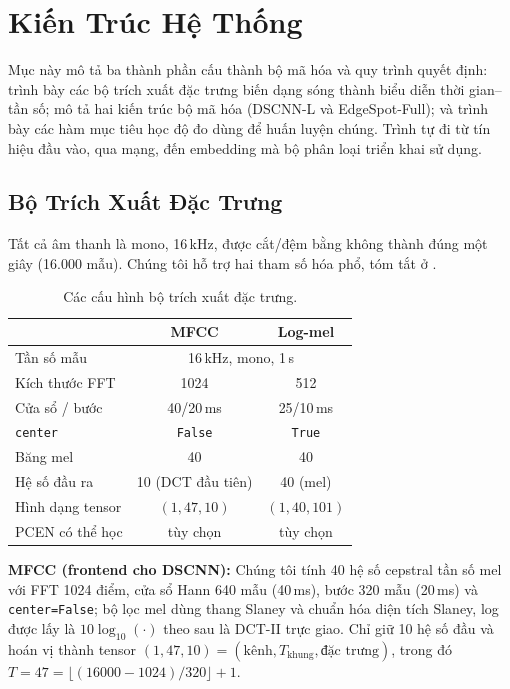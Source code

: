 \documentclass[12pt,a4paper]{report}
\newcommand{\code}[1]{\texttt{\small #1}}
\begin{document}
\section{Kiến Trúc Hệ Thống}\label{sec:arch}

Mục này mô tả ba thành phần cấu thành bộ mã hóa và quy trình quyết định:
 trình bày các bộ trích xuất đặc trưng biến dạng sóng thành
biểu diễn thời gian--tần số;  mô tả hai kiến trúc bộ mã hóa
(DSCNN-L và EdgeSpot-Full); và  trình bày các hàm mục tiêu học
độ đo dùng để huấn luyện chúng. Trình tự đi từ tín hiệu đầu vào, qua mạng, đến
embedding mà bộ phân loại triển khai sử dụng.

\subsection{Bộ Trích Xuất Đặc Trưng}\label{sec:frontends}

Tất cả âm thanh là mono, 16\,kHz, được cắt/đệm bằng không thành đúng một giây
(16.000 mẫu). Chúng tôi hỗ trợ hai tham số hóa phổ, tóm tắt ở .

\begin{table}[H]
\centering
\caption{Các cấu hình bộ trích xuất đặc trưng.}
\label{tab:features}
\begin{tabular}{lcc}
\toprule
 & \textbf{MFCC} & \textbf{Log-mel} \\
\midrule
Tần số mẫu    & \multicolumn{2}{c}{16\,kHz, mono, 1\,s} \\
Kích thước FFT & 1024  & 512  \\
Cửa sổ / bước  & 40/20\,ms & 25/10\,ms \\
\code{center}  & \code{False} & \code{True} \\
Băng mel       & 40 & 40 \\
Hệ số đầu ra   & 10 (DCT đầu tiên) & 40 (mel) \\
Hình dạng tensor & $(1,47,10)$ & $(1,40,101)$ \\
PCEN có thể học & tùy chọn & tùy chọn \\
\bottomrule
\end{tabular}
\end{table}

\textbf{MFCC (frontend cho DSCNN):} Chúng tôi tính 40 hệ số cepstral tần số mel
với FFT 1024 điểm, cửa sổ Hann 640 mẫu (40\,ms), bước 320 mẫu (20\,ms) và
\code{center=False}; bộ lọc mel dùng thang Slaney và chuẩn hóa diện tích Slaney,
log được lấy là $10\log_{10}(\cdot)$ theo sau là DCT-II trực giao. Chỉ giữ 10 hệ
số đầu và hoán vị thành tensor $(1,47,10)=(\text{kênh}, T_{\text{khung}},
\text{đặc trưng})$, trong đó $T = 47 = \lfloor(16000-1024)/320\rfloor + 1$.
\end{document}
